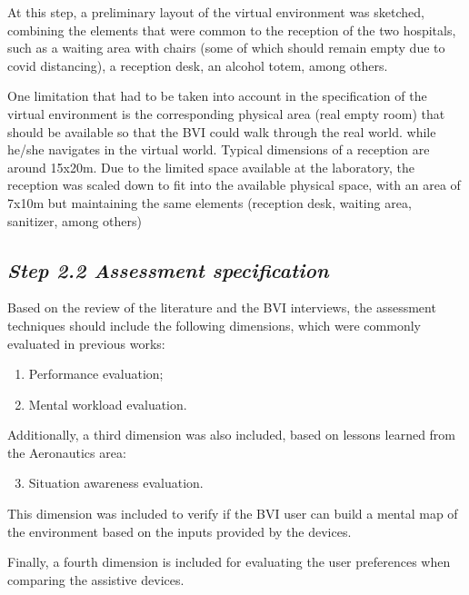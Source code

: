         At this step, a preliminary layout of the virtual environment was sketched, combining the elements that were common to the reception of the two hospitals, such as a waiting area with chairs (some of which should remain empty due to covid distancing), a reception desk, an alcohol totem, among others.

        One limitation that had to be taken into account in the specification of the virtual environment is the corresponding physical area (real empty room) that should be available so that the BVI could walk through the real world. while he/she navigates in the virtual world. Typical dimensions of a reception are around 15x20m. Due to the limited space available at the laboratory, the reception was scaled down to fit into the available physical space, with an area of 7x10m but maintaining the same elements (reception desk, waiting area, sanitizer, among others)
    

    \subsection*{\textit{Step 2.2 Assessment specification}}
        Based on the review of the literature and the BVI interviews, the assessment techniques should include the following dimensions, which were commonly evaluated in previous works: 

        \begin{enumerate} [label = \Alph*)]
            \item Performance evaluation;
            \item Mental workload evaluation.
        \end{enumerate}
            
        Additionally, a third dimension was also included, based on lessons learned from the Aeronautics area:   

        \begin{enumerate} [label = \Alph*)]
            \setcounter{enumi}{2}
            \item Situation awareness evaluation.
        \end{enumerate}
            
        This dimension was included to verify if the BVI user can build a mental map of the environment based on the inputs provided by the devices.

        Finally, a fourth dimension is included for evaluating the user preferences when comparing the assistive devices.

